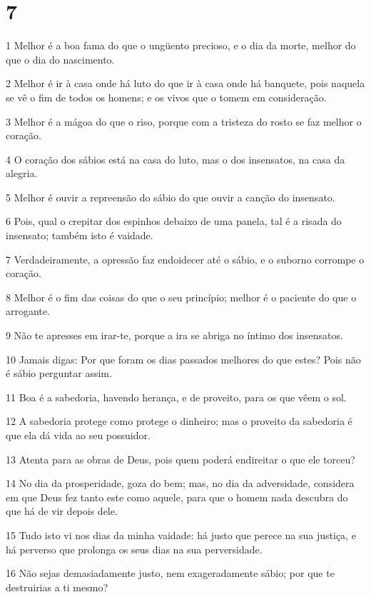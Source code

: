 \chapter{7}

\par 1 Melhor é a boa fama do que o ungüento precioso, e o dia da morte, melhor do que o dia do nascimento.
\par 2 Melhor é ir à casa onde há luto do que ir à casa onde há banquete, pois naquela se vê o fim de todos os homens; e os vivos que o tomem em consideração.
\par 3 Melhor é a mágoa do que o riso, porque com a tristeza do rosto se faz melhor o coração.
\par 4 O coração dos sábios está na casa do luto, mas o dos insensatos, na casa da alegria.
\par 5 Melhor é ouvir a repreensão do sábio do que ouvir a canção do insensato.
\par 6 Pois, qual o crepitar dos espinhos debaixo de uma panela, tal é a risada do insensato; também isto é vaidade.
\par 7 Verdadeiramente, a opressão faz endoidecer até o sábio, e o suborno corrompe o coração.
\par 8 Melhor é o fim das coisas do que o seu princípio; melhor é o paciente do que o arrogante.
\par 9 Não te apresses em irar-te, porque a ira se abriga no íntimo dos insensatos.
\par 10 Jamais digas: Por que foram os dias passados melhores do que estes? Pois não é sábio perguntar assim.
\par 11 Boa é a sabedoria, havendo herança, e de proveito, para os que vêem o sol.
\par 12 A sabedoria protege como protege o dinheiro; mas o proveito da sabedoria é que ela dá vida ao seu possuidor.
\par 13 Atenta para as obras de Deus, pois quem poderá endireitar o que ele torceu?
\par 14 No dia da prosperidade, goza do bem; mas, no dia da adversidade, considera em que Deus fez tanto este como aquele, para que o homem nada descubra do que há de vir depois dele.
\par 15 Tudo isto vi nos dias da minha vaidade: há justo que perece na sua justiça, e há perverso que prolonga os seus dias na sua perversidade.
\par 16 Não sejas demasiadamente justo, nem exageradamente sábio; por que te destruirias a ti mesmo?
